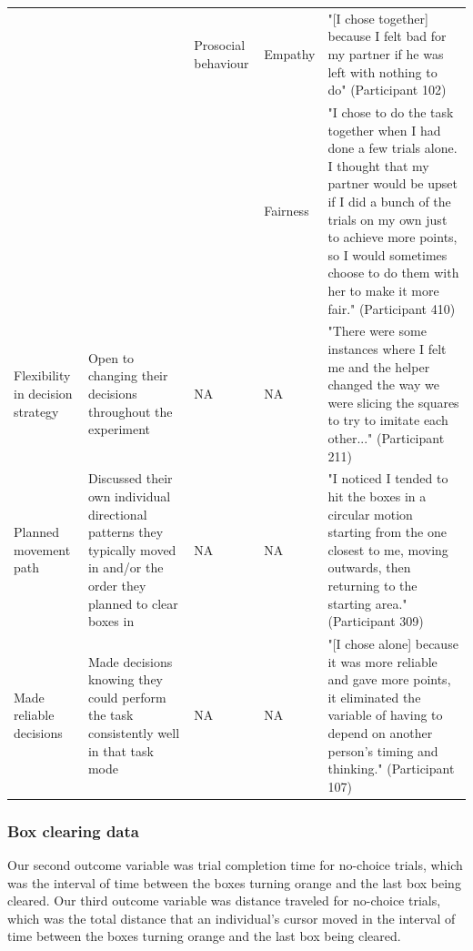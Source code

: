 \documentclass[
  man,
  floatsintext,
  longtable,
  nolmodern,
  notxfonts,
  notimes,
  colorlinks=true,linkcolor=blue,citecolor=blue,urlcolor=blue]{apa7}
\begin{document}
\begin{landscape}
\begin{longtable*}[l]{>{\raggedright\arraybackslash}p{3cm}>{\raggedright\arraybackslash}p{6cm}>{\raggedright\arraybackslash}p{3cm}>{\raggedright\arraybackslash}p{2cm}>{\raggedright\arraybackslash}p{6cm}}
\addlinespace
 &  & Prosocial behaviour & Empathy & "[I chose together] because I felt bad for my partner if he was left with nothing to do" (Participant 102)\\
\addlinespace
 &  &  & Fairness & "I chose to do the task together when I had done a few trials alone. I thought that my partner would be upset if I did a bunch of the trials on my own just to achieve more points, so I would sometimes choose to do them with her to make it more fair." (Participant 410)\\
\addlinespace
Flexibility in decision strategy & Open to changing their decisions throughout the experiment & NA & NA & "There were some instances where I felt me and the helper changed the way we were slicing the squares to try to imitate each other..." (Participant 211)\\
\addlinespace
Planned movement path & Discussed their own individual directional patterns they typically moved in and/or the order they planned to clear boxes in & NA & NA & "I noticed I tended to hit the boxes in a circular motion starting from the one closest to me, moving outwards, then returning to the starting area." (Participant 309)\\
\addlinespace
Made reliable decisions & Made decisions knowing they could perform the task consistently well in that task mode & NA & NA & "[I chose alone] because it was more reliable and gave more points, it eliminated the variable of having to depend on another person's timing and thinking." (Participant 107)\\
\bottomrule
\end{longtable*}
\endgroup{}

\end{landscape}

\clearpage

\subsubsection{Box clearing data}\label{box-clearing-data}

Our second outcome variable was trial completion time for no-choice
trials, which was the interval of time between the boxes turning orange
and the last box being cleared. Our third outcome variable was distance
traveled for no-choice trials, which was the total distance that an
individual's cursor moved in the interval of time between the boxes
turning orange and the last box being cleared.
\end{document}
